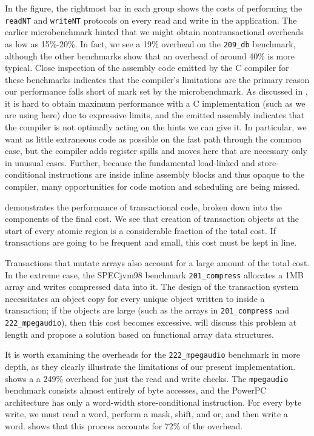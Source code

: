 In the figure, the rightmost bar in each group shows the costs of
performing the \texttt{readNT} and \texttt{writeNT} protocols on every
read and write in the application.  
The earlier microbenchmark hinted that we might obtain
nontransactional overheads as low as 15\%-20\%.
In fact, we see a 19\%
overhead on the \texttt{209\_db} benchmark, although the other
benchmarks show that an overhead of around 40\% is more typical.
Close inspection of the assembly code emitted by the C compiler for
these benchmarks indicates that the compiler's limitations are
the primary reason our performance falls short of mark set by the
microbenchmark.   As discussed in , it is hard to
obtain maximum performance with a C implementation (such as we are
using here) due to expressive limits, and the emitted assembly
indicates that the compiler is not optimally acting on the hints we
can give it.  In particular, we want as little extraneous code as
possible on the fast path through the common case, but the compiler
adds register spills and moves here that are necessary only in
unusual cases.  Further, because the fundamental load-linked and
store-conditional instructions are inside inline assembly blocks and
thus opaque to the compiler, many opportunities for code motion and
scheduling are being missed.

 demonstrates the performance of transactional
code, broken down into the components of the final cost.  We see that
creation of transaction objects at the start of every atomic region is
a considerable fraction of the total cost.  If transactions are going
to be frequent and small, this cost must be kept in line.

Transactions that mutate arrays also account for a large amount of
the total cost.  In the extreme case, the SPECjvm98 benchmark
\texttt{201\_compress} allocates a 1MB array and writes compressed
data into it.  The design of the \apex transaction system necessitates an
object copy for every unique object written to inside a transaction;
if the objects are large (such as the arrays in
\texttt{201\_compress} and \texttt{222\_mpegaudio}), then this cost
becomes excessive.   will discuss this problem at
length and propose a solution based on functional array data
structures.

It is worth examining the overheads for the \texttt{222\_mpegaudio}
benchmark in more depth, as they clearly illustrate the limitations of
our present implementation.   shows a
a 249\% overhead for just the read and write checks.
The \texttt{mpegaudio} benchmark
consists almost entirely of byte accesses, and the PowerPC architecture
has only a word-width store-conditional instruction.  For every byte
write, we must read a word, perform a mask, shift, and or, and then
write a word.   shows that this process accounts
for 72\% of the overhead.

